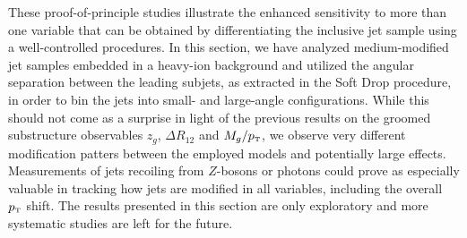 These proof-of-principle studies illustrate the enhanced sensitivity to more than one variable that can be obtained by differentiating the inclusive jet sample using a well-controlled procedures. 
In this section, we have analyzed medium-modified jet samples embedded in a heavy-ion background and utilized the angular separation between the leading subjets, as extracted in the Soft Drop procedure, in order to bin the jets into small- and large-angle configurations. While this should not come as a surprise in light of the previous results on the groomed substructure observables $z_g$, $\Delta R_{12}$ and $M_g/p_{\text{\tiny T}}$, we observe very different modification patters between the employed models and potentially large effects. Measurements of jets recoiling from $Z$-bosons or photons could prove as especially valuable in tracking how jets are modified in all variables, including the overall $p_{\text{\tiny T}}$ shift.
The results presented in this section are only exploratory and more systematic studies are left for the future.
